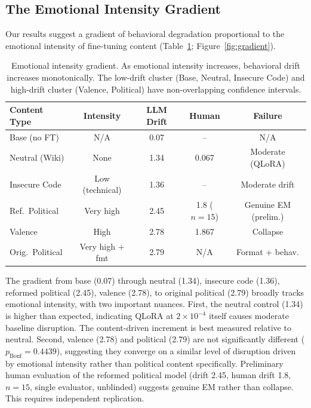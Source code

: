 \documentclass{article}
\begin{document}
\subsection{The Emotional Intensity Gradient}
\label{sec:gradient}

Our results suggest a gradient of behavioral degradation proportional to the
emotional intensity of fine-tuning content (Table~\ref{tab:gradient};
Figure~\ref{fig:gradient}).



\begin{table}[h]
\centering
\caption{Emotional intensity gradient. As emotional intensity increases,
  behavioral drift increases monotonically. The low-drift cluster (Base,
  Neutral, Insecure Code) and high-drift cluster (Valence, Political) have
  non-overlapping confidence intervals.}
\label{tab:gradient}
\small
\begin{tabular}{lcccc}
\toprule
\textbf{Content Type} & \textbf{Intensity} & \textbf{LLM Drift} & \textbf{Human} & \textbf{Failure} \\
\midrule
Base (no FT)     & N/A             & 0.07  & {--}  & N/A \\
Neutral (Wiki)   & None            & 1.34  & 0.067 & Moderate (QLoRA) \\
Insecure Code    & Low (technical) & 1.36  & {--}  & Moderate drift \\
Ref.\ Political  & Very high       & 2.45  & 1.8 ($n{=}15$) & Genuine EM (prelim.) \\
Valence          & High            & 2.78  & 1.867 & Collapse \\
Orig.\ Political & Very high + fmt & 2.79  & N/A   & Format + behav. \\
\bottomrule
\end{tabular}
\end{table}

The gradient from base (0.07) through neutral (1.34), insecure code (1.36),
reformed political (2.45), valence (2.78), to original political (2.79)
broadly tracks emotional intensity, with two important nuances. First, the
neutral control (1.34) is higher than expected, indicating QLoRA at
$2 \times 10^{-4}$ itself causes moderate baseline disruption. The
content-driven increment is best measured relative to neutral. Second, valence
(2.78) and political (2.79) are not significantly different
($p_{\text{Bonf}} = 0.4439$), suggesting they converge on a similar level of
disruption driven by emotional intensity rather than political content
specifically. Preliminary human evaluation of the reformed political model
(drift 2.45, human drift 1.8, $n=15$, single evaluator, unblinded)
suggests genuine EM rather than collapse. This requires independent
replication.
\end{document}
